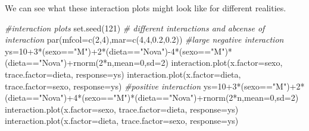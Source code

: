 \documentclass[
]{book}
\newenvironment{Shaded}{\begin{snugshade}}{\end{snugshade}}
\newcommand{\AttributeTok}[1]{\textcolor[rgb]{0.77,0.63,0.00}{#1}}
\newcommand{\CommentTok}[1]{\textcolor[rgb]{0.56,0.35,0.01}{\textit{#1}}}
\newcommand{\DecValTok}[1]{\textcolor[rgb]{0.00,0.00,0.81}{#1}}
\newcommand{\FloatTok}[1]{\textcolor[rgb]{0.00,0.00,0.81}{#1}}
\newcommand{\FunctionTok}[1]{\textcolor[rgb]{0.00,0.00,0.00}{#1}}
\newcommand{\NormalTok}[1]{#1}
\newcommand{\OtherTok}[1]{\textcolor[rgb]{0.56,0.35,0.01}{#1}}
\newcommand{\SpecialCharTok}[1]{\textcolor[rgb]{0.00,0.00,0.00}{#1}}
\newcommand{\StringTok}[1]{\textcolor[rgb]{0.31,0.60,0.02}{#1}}
\begin{document}
We can see what these interaction plots might look like for different realities.

\begin{Shaded}
\begin{Highlighting}[]
\CommentTok{\#interaction plots}
\FunctionTok{set.seed}\NormalTok{(}\DecValTok{121}\NormalTok{)}
\CommentTok{\# different interactions and abcense of interaction}
\FunctionTok{par}\NormalTok{(}\AttributeTok{mfcol=}\FunctionTok{c}\NormalTok{(}\DecValTok{2}\NormalTok{,}\DecValTok{4}\NormalTok{),}\AttributeTok{mar=}\FunctionTok{c}\NormalTok{(}\DecValTok{4}\NormalTok{,}\DecValTok{4}\NormalTok{,}\FloatTok{0.2}\NormalTok{,}\FloatTok{0.2}\NormalTok{))}
\CommentTok{\#large negative interaction}
\NormalTok{ys}\OtherTok{=}\DecValTok{10}\SpecialCharTok{+}\DecValTok{3}\SpecialCharTok{*}\NormalTok{(sexo}\SpecialCharTok{==}\StringTok{"M"}\NormalTok{)}\SpecialCharTok{+}\DecValTok{2}\SpecialCharTok{*}\NormalTok{(dieta}\SpecialCharTok{==}\StringTok{"Nova"}\NormalTok{)}\SpecialCharTok{{-}}\DecValTok{4}\SpecialCharTok{*}\NormalTok{(sexo}\SpecialCharTok{==}\StringTok{"M"}\NormalTok{)}\SpecialCharTok{*}\NormalTok{(dieta}\SpecialCharTok{==}\StringTok{"Nova"}\NormalTok{)}\SpecialCharTok{+}\FunctionTok{rnorm}\NormalTok{(}\DecValTok{2}\SpecialCharTok{*}\NormalTok{n,}\AttributeTok{mean=}\DecValTok{0}\NormalTok{,}\AttributeTok{sd=}\DecValTok{2}\NormalTok{)}
\FunctionTok{interaction.plot}\NormalTok{(}\AttributeTok{x.factor=}\NormalTok{sexo, }\AttributeTok{trace.factor=}\NormalTok{dieta, }\AttributeTok{response=}\NormalTok{ys)}
\FunctionTok{interaction.plot}\NormalTok{(}\AttributeTok{x.factor=}\NormalTok{dieta, }\AttributeTok{trace.factor=}\NormalTok{sexo, }\AttributeTok{response=}\NormalTok{ys)}
\CommentTok{\#positive interaction}
\NormalTok{ys}\OtherTok{=}\DecValTok{10}\SpecialCharTok{+}\DecValTok{3}\SpecialCharTok{*}\NormalTok{(sexo}\SpecialCharTok{==}\StringTok{"M"}\NormalTok{)}\SpecialCharTok{+}\DecValTok{2}\SpecialCharTok{*}\NormalTok{(dieta}\SpecialCharTok{==}\StringTok{"Nova"}\NormalTok{)}\SpecialCharTok{+}\DecValTok{4}\SpecialCharTok{*}\NormalTok{(sexo}\SpecialCharTok{==}\StringTok{"M"}\NormalTok{)}\SpecialCharTok{*}\NormalTok{(dieta}\SpecialCharTok{==}\StringTok{"Nova"}\NormalTok{)}\SpecialCharTok{+}\FunctionTok{rnorm}\NormalTok{(}\DecValTok{2}\SpecialCharTok{*}\NormalTok{n,}\AttributeTok{mean=}\DecValTok{0}\NormalTok{,}\AttributeTok{sd=}\DecValTok{2}\NormalTok{)}
\FunctionTok{interaction.plot}\NormalTok{(}\AttributeTok{x.factor=}\NormalTok{sexo, }\AttributeTok{trace.factor=}\NormalTok{dieta, }\AttributeTok{response=}\NormalTok{ys)}
\FunctionTok{interaction.plot}\NormalTok{(}\AttributeTok{x.factor=}\NormalTok{dieta, }\AttributeTok{trace.factor=}\NormalTok{sexo, }\AttributeTok{response=}\NormalTok{ys)}

\end{Highlighting}
\end{Shaded}
\end{document}
